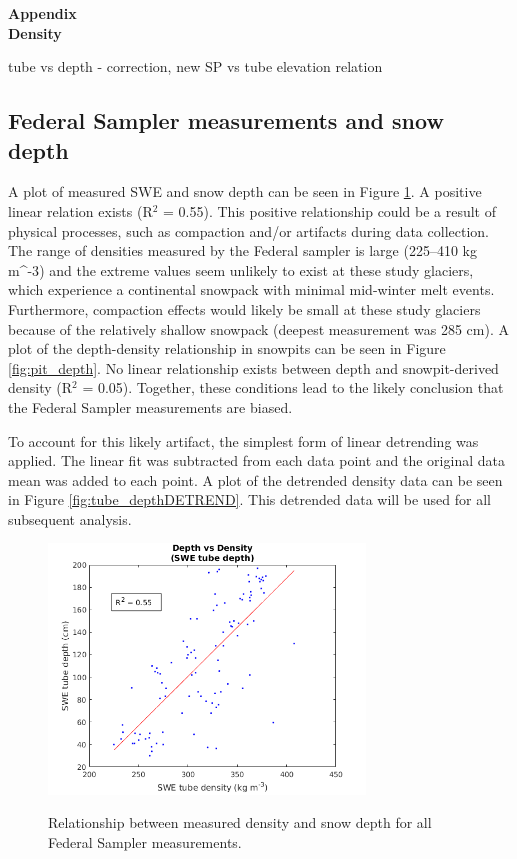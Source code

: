 \documentclass[12pt]{article}
\begin{document}

\begin{center}
\Large \textbf{Appendix\\ Density}
\end{center}

tube vs depth - correction, new SP vs tube
elevation relation

\subsection*{Federal Sampler measurements and snow depth}

A plot of measured SWE and snow depth can be seen in Figure \ref{fig:tube_depth}. A positive linear relation exists (R$^2$ = 0.55). This positive relationship could be a result of physical processes, such as compaction and/or artifacts during data collection. The range of densities measured by the Federal sampler is large (225--410 kg m^{-3}) and the extreme values seem unlikely to exist at these study glaciers, which experience a continental snowpack with minimal mid-winter melt events. Furthermore, compaction effects would likely be small at these study glaciers because of the relatively shallow snowpack (deepest measurement was 285 cm). A plot of the depth-density relationship in snowpits can be seen in Figure \ref{fig:pit_depth}. No linear relationship exists between depth and snowpit-derived density (R$^2$ = 0.05). Together, these conditions lead to the likely conclusion that the Federal Sampler measurements are biased. 

To account for this likely artifact, the simplest form of linear detrending was applied. The linear fit was subtracted from each data point and the original data mean was added to each point. A plot of the detrended density data can be seen in Figure \ref{fig:tube_depthDETREND}. This detrended data will be used for all subsequent analysis. 

\begin{figure} 
	\centering
	\includegraphics[width =0.75\textwidth]{DepthDensity_SWEtube.png}\\
	\caption{Relationship between measured density and snow depth for all Federal Sampler measurements.}
	\label{fig:tube_depth}
\end{figure}
\end{document}
